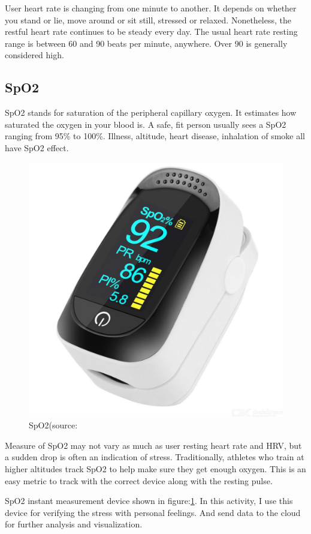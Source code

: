 User heart rate is changing from one minute to another. It depends on whether you stand or lie, move around or sit still, stressed or relaxed. Nonetheless, the restful heart rate continues to be steady every day. The usual heart rate resting range is between 60 and 90 beats per minute, anywhere. Over 90 is generally considered high.\citep{LeWine2011IncreasePublishing}
\subsection{\acf{SpO2}}
\acs{SpO2} stands for saturation of the peripheral capillary oxygen. It estimates how saturated the oxygen in your blood is. A safe, fit person usually sees a \acs{SpO2} ranging from 95\% to 100\%. Illness, altitude, heart disease, inhalation of smoke all have \acs{SpO2} effect.\citep{Sly2019ManagingBiostrap}
\begin{figure}[hbt!] 
  \centering
  \includegraphics[width=0.5\linewidth]{chap4/image4/spo22.jpg}
  \caption[\acf{SpO2}]{\acf{SpO2}(source:\cite{Teleportz2019A2Shop}}
  \label{fig:spo2}
\end{figure}
 Measure of \acs{SpO2} may not vary as much as user resting heart rate and HRV, but a sudden drop is often an indication of stress. Traditionally, athletes who train at higher altitudes track \acs{SpO2} to help make sure they get enough oxygen. This is an easy metric to track with the correct device along with the resting pulse.

\acs{SpO2} instant measurement device shown in figure:\ref{fig:spo2}. In this activity, I use this device for verifying the stress with personal feelings. And send data to the cloud for further analysis and visualization.

